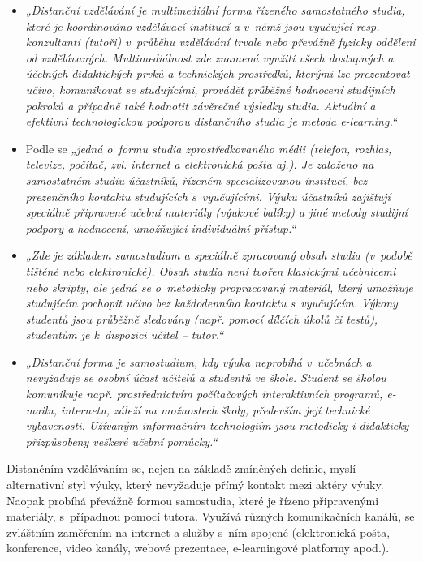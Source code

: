 \documentclass[
print,
  11pt,
  table,   
  nolof,    
  nolot,
  oneside,final
]{fithesis3}
\begin{document}
      \begin{itemize}
	\item \emph{„Distanční vzdělávání je multimediální forma řízeného samostatné\-ho studia, které je koordinováno vzdělávací institucí a v~němž jsou vyučující resp. konzultanti (tutoři) v~průběhu vzdělávání trvale nebo převážně fyzicky odděleni od vzdělávaných. Multimediálnost zde znamená využití všech dostupných a účelných didaktických prvků a technických prostředků, kterými lze prezentovat učivo, komunikovat se studujícími, provádět průběžné hodnocení studijních pokroků a případně také hodnotit závěrečné výsledky studia. Aktuální a efektivní technologickou podporou distančního studia je metoda e-learn\-ing.“} \cite{zlamalova} 
	\item Podle \cite{prucha} se \emph{„jedná o~formu studia zprostředkovaného médii (telefon, rozhlas, televize, počítač, zvl. internet a elektronická pošta aj.). Je založeno na samostatném studiu účastníků, řízeném specializovanou institucí, bez prezenčního kontaktu studujících s~vyučujícími. Výuku účastníků zajišťují speciálně připravené učební materiály (výukové balíky) a jiné metody studijní podpory a hodnocení, umožňující individuální přístup.“} 
	\item \emph{„Zde je základem samostudium a speciálně zpracovaný obsah studia (v~podobě tištěné nebo elektronické). Obsah studia není tvořen klasickými učebnicemi nebo skripty, ale jedná se o~metodicky propracovaný materiál, který umožňuje studujícím pochopit učivo bez každodenního kontaktu s~vyučujícím. Výkony studentů jsou průběžně sledovány (např. pomocí dílčích úkolů či testů), studentům je k~dispozici učitel – tutor.“}\cite{cznic}

	\item \emph{„Distanční forma je samostudium, kdy výuka neprobíhá v~učebnách a nevyžaduje se osobní účast učitelů a studentů ve škole. Student se školou komunikuje např. prostřednictvím počítačových interaktivních programů, e-mailu, internetu, záleží na  možnostech školy, především její technické vybavenosti. Užívaným informačním technologiím jsou metodicky i didakticky přizpůsobeny veškeré učební pomůcky.“} \cite{nuov}
     \end{itemize}

Distančním vzděláváním se, nejen na základě zmíněných definic, myslí alternativní styl výuky, který nevyžaduje přímý kontakt mezi aktéry výuky. Naopak probíhá převážně formou samostudia, které je řízeno připravenými materiály, s~případnou pomocí tutora. Využívá různých komunikačních kanálů, se zvláštním zaměřením na internet a služby s~ním spojené (elektronická pošta, konference, video kanály, webové prezentace, e-learn\-ingové platformy apod.).
\end{document}

